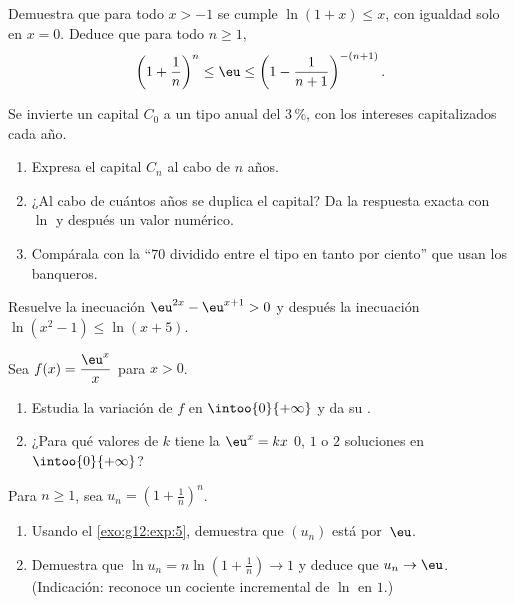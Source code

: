 \begin{exercise}[$\star\star$]\label{exo:g12:exp:5}
Demuestra que para todo $x > -1$ se cumple $\ln(1 + x) \leq x$, con igualdad
solo en $x = 0$. Deduce que para todo $n \geq 1$,
\[
\left(1 + \frac{1}{n}\right)^n \leq \eu \leq \left(1 - \frac{1}{n+1}\right)^{-(n+1)} .
\]
\end{exercise}

\begin{exercise}[$\star\star$]\label{exo:g12:exp:6}
Se invierte un capital $C_0$ a un tipo anual del $3\,\%$, con los intereses
capitalizados cada año.
\begin{enumerate}
  \item Expresa el capital $C_n$ al cabo de $n$ años.
  \item ¿Al cabo de cuántos años se duplica el capital? Da la respuesta
        exacta con $\ln$ y después un valor numérico.
  \item Compárala con la  ``$70$ dividido entre el tipo en tanto
        por ciento'' que usan los banqueros.
\end{enumerate}
\end{exercise}

\begin{exercise}[$\star\star$]\label{exo:g12:exp:7}
Resuelve la inecuación $\eu^{2x} - \eu^{x+1} > 0$ y después la inecuación
$\ln(x^2 - 1) \leq \ln(x + 5)$.
\end{exercise}

\begin{exercise}[$\star\star\star$]\label{exo:g12:exp:8}
Sea $f(x) = \dfrac{\eu^x}{x}$ para $x > 0$.
\begin{enumerate}
  \item Estudia la variación de $f$ en $\intoo{0}{+\infty}$ y da su .
  \item ¿Para qué valores de $k$ tiene la  $\eu^x = kx$ $0$, $1$ o
        $2$ soluciones en $\intoo{0}{+\infty}$?
\end{enumerate}
\end{exercise}

\begin{exercise}[$\star\star\star$]\label{exo:g12:exp:9}
Para $n \geq 1$, sea $u_n = \left(1 + \frac1n\right)^n$.
\begin{enumerate}
  \item Usando el \cref{exo:g12:exp:5}, demuestra que $(u_n)$ está  por~$\eu$.
  \item Demuestra que $\ln u_n = n \ln\left(1 + \frac1n\right) \to 1$ y
        deduce que $u_n \to \eu$. (Indicación: reconoce un cociente
        incremental de $\ln$ en $1$.)
\end{enumerate}
\end{exercise}

